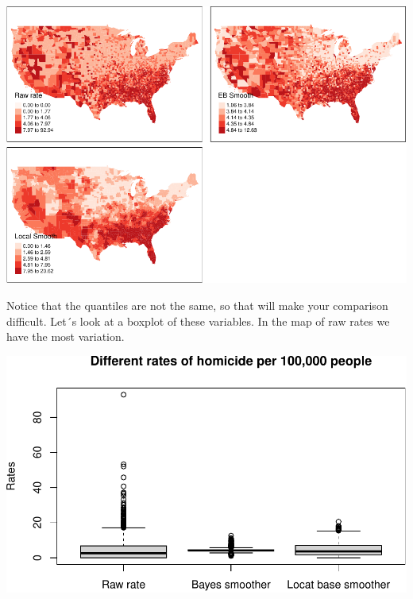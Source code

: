 \documentclass[
]{book}
\makeatletter
\newenvironment{Shaded}{\begin{snugshade}}{\end{snugshade}}
\newcommand{\AttributeTok}[1]{\textcolor[rgb]{0.61,0.61,0.61}{#1}}
\newcommand{\CommentTok}[1]{\textcolor[rgb]{0.37,0.37,0.37}{\textit{#1}}}
\newcommand{\FunctionTok}[1]{\textcolor[rgb]{0,0,0}{#1}}
\newcommand{\NormalTok}[1]{#1}
\newcommand{\SpecialCharTok}[1]{\textcolor[rgb]{0,0,0}{#1}}
\newcommand{\StringTok}[1]{\textcolor[rgb]{0.5,0.5,0.5}{#1}}
\newenvironment{kframe}{%
\medskip{}
\setlength{\fboxsep}{.8em}
 \def\at@end@of@kframe{}%
 \ifinner\ifhmode%
  \def\at@end@of@kframe{\end{minipage}}%
  \begin{minipage}{\columnwidth}%
 \fi\fi%
 \def\FrameCommand##1{\hskip\@totalleftmargin \hskip-\fboxsep
 \colorbox{shadecolor}{##1}\hskip-\fboxsep
     \hskip-\linewidth \hskip-\@totalleftmargin \hskip\columnwidth}%
 \MakeFramed {\advance\hsize-\width
   \@totalleftmargin\z@ \linewidth\hsize
   \@setminipage}}%
 {\par\unskip\endMakeFramed%
 \at@end@of@kframe}
\renewenvironment{Shaded}{\begin{kframe}}{\end{kframe}}
\makeatother
\begin{document}
\includegraphics{crime_mapping_files/figure-latex/unnamed-chunk-116-1.pdf}

Notice that the quantiles are not the same, so that will make your comparison difficult. Let´s look at a boxplot of these variables. In the map of raw rates we have the most variation.

\begin{Shaded}
\end{Shaded}

\includegraphics{crime_mapping_files/figure-latex/unnamed-chunk-117-1.pdf}
\end{document}
